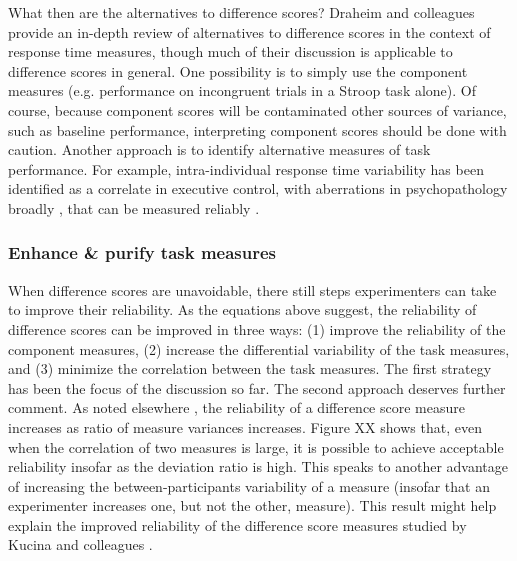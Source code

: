 \documentclass[a4paper,notitlepage,12pt]{article}
\begin{document}
What then are the alternatives to difference scores? Draheim and colleagues \cite{draheim2019reaction} provide an in-depth review of alternatives to difference scores in the context of response time measures, though much of their discussion is applicable to difference scores in general. One possibility is to simply use the component measures (e.g. performance on incongruent trials in a Stroop task alone). Of course, because component scores will be contaminated other sources of variance, such as baseline performance, interpreting component scores should be done with caution. Another approach is to identify alternative measures of task performance. For example, intra-individual response time variability has been identified as a correlate in executive control, with aberrations in psychopathology broadly \cite{kofler2013reaction}, that can be measured reliably \cite{saville2011stability}. 

\subsubsection{Enhance \& purify task measures}

When difference scores are unavoidable, there still steps experimenters can take to improve their reliability. As the equations above suggest, the reliability of difference scores can be improved in three ways: (1) improve the reliability of the component measures, (2) increase the differential variability of the task measures, and (3) minimize the correlation between the task measures. The first strategy has been the focus of the discussion so far. The second approach deserves further comment. As noted elsewhere \cite{trafimow2015defense, chiou1996reliability}, the reliability of a difference score measure increases as ratio of measure variances increases. Figure XX shows that, even when the correlation of two measures is large, it is possible to achieve acceptable reliability insofar as the deviation ratio is high. This speaks to another advantage of increasing the between-participants variability of a measure (insofar that an experimenter increases one, but not the other, measure). This result might help explain the improved reliability of the difference score measures studied by Kucina and colleagues \cite{kucina2022solution}.
\end{document}

